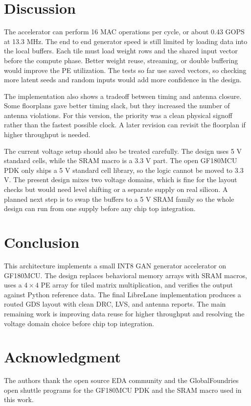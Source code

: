 \documentclass[conference]{IEEEtran}
\begin{document}
\section{Discussion}\label{sec:disc}
The accelerator can perform 16 MAC operations per cycle, or about 0.43 GOPS at 13.3 MHz. The end to end generator speed is still limited by loading data into the local buffers. Each tile must load weight rows and the shared input vector before the compute phase. Better weight reuse, streaming, or double buffering would improve the PE utilization. The tests so far use saved vectors, so checking more latent seeds and random inputs would add more confidence in the design.

The implementation also shows a tradeoff between timing and antenna closure. Some floorplans gave better timing slack, but they increased the number of antenna violations. For this version, the priority was a clean physical signoff rather than the fastest possible clock. A later revision can revisit the floorplan if higher throughput is needed.

The current voltage setup should also be treated carefully. The design uses 5 V standard cells, while the SRAM macro is a 3.3 V part. The open GF180MCU PDK only ships a 5 V standard cell library, so the logic cannot be moved to 3.3 V. The present design mixes two voltage domains, which is fine for the layout checks but would need level shifting or a separate supply on real silicon. A planned next step is to swap the buffers to a 5 V SRAM family so the whole design can run from one supply before any chip top integration.

\section{Conclusion}\label{sec:concl}
This architecture implements a small INT8 GAN generator accelerator on GF180MCU. The design replaces behavioral memory arrays with SRAM macros, uses a $4\times4$ PE array for tiled matrix multiplication, and verifies the output against Python reference data. The final LibreLane implementation produces a routed GDS layout with clean DRC, LVS, and antenna reports. The main remaining work is improving data reuse for higher throughput and resolving the voltage domain choice before chip top integration.

\section*{Acknowledgment}
The authors thank the open source EDA community and the GlobalFoundries open shuttle programs for the GF180MCU PDK and the SRAM macro used in this work.
\end{document}
